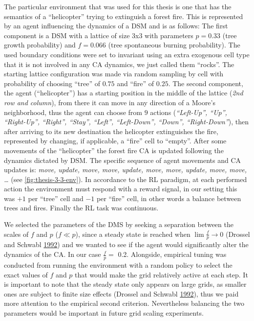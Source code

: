 \documentclass[
  openany]{book}
\begin{document}
The particular environment that was used for this thesis is one that has the semantics of a ``helicopter'' trying to extinguish a forest fire. This is represented by an agent influencing the dynamics of a DSM and is as follows: The first component is a DSM with a lattice of size 3x3 with parameters \(p=0.33\) (tree growth probability) and \(f=0.066\) (tree spontaneous burning probability). The used boundary conditions were set to invariant using an extra exogenous cell type that it is not involved in any CA dynamics, we just called them ``rocks''. The starting lattice configuration was made via random sampling by cell with probability of choosing ``tree'' of \(0.75\) and ``fire'' of \(0.25\). The second component, the agent (``helicopter'') has a starting position in the middle of the lattice (\emph{2nd row and column}), from there it can move in any direction of a Moore's neighborhood, thus the agent can choose from \(9\) actions (\emph{``Left-Up'', ``Up'', ``Right-Up'', ``Right'', ``Stay'', ``Left'', ``Left-Down'', ``Down'', ``Right-Down''}), then after arriving to its new destination the helicopter extinguishes the fire, represented by changing, if applicable, a ``fire'' cell to ``empty''. After some movements of the ``helicopter'' the forest fire CA is updated following the dynamics dictated by DSM. The specific sequence of agent movements and CA updates is: \emph{move, update, move, move, update, move, move, update, move, move, \ldots{}} (see \ref{fig:thesis-3-3-env}). In accordance to the RL paradigm, at each performed action the environment must respond with a reward signal, in our setting this was \(+1\) per ``tree'' cell and \(-1\) per ``fire'' cell, in other words a balance between trees and fires. Finally the RL task was continuous.

We selected the parameters of the DMS by seeking a separation between the scales of \(f\) and \(p\) (\(f \ll p\)), since a steady state is reached when \(\lim \frac {f}{p} \to 0\) (Drossel and Schwabl \protect\hyperlink{ref-drossel1992self}{1992}) and we wanted to see if the agent would significantly alter the dynamics of the CA. In our case \(\frac {f}{p}=\) 0.2. Alongside, empirical tuning was conducted from running the environment with a random policy to select the exact values of \(f\) and \(p\) that would make the grid relatively active at each step. It is important to note that the steady state only appears on large grids, as smaller ones are subject to finite size effects (Drossel and Schwabl \protect\hyperlink{ref-drossel1992self}{1992}), thus we paid more attention to the empirical second criterion. Nevertheless balancing the two parameters would be important in future grid scaling experiments.
\end{document}
